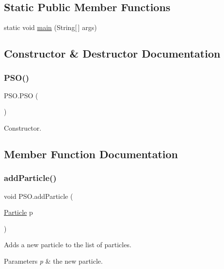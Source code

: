 \subsection*{Static Public Member Functions}
\begin{DoxyCompactItemize}
\item 
static void \hyperlink{class_p_s_o_a966198c3d9ecb21acf593a5e922ba843}{main} (String\mbox{[}$\,$\mbox{]} args)
\end{DoxyCompactItemize}


\subsection{Constructor \& Destructor Documentation}
\mbox{\label{class_p_s_o_a0aeec4970276a5e318b613e8a192064e}} 
\subsubsection{\texorpdfstring{P\+S\+O()}{PSO()}}
{\footnotesize\ttfamily P\+S\+O.\+P\+SO (\begin{DoxyParamCaption}{ }\end{DoxyParamCaption})}

Constructor. 

\subsection{Member Function Documentation}
\mbox{\label{class_p_s_o_ac3676d8b4b6eb1fcb0c05a14a20af85c}} 
\subsubsection{\texorpdfstring{add\+Particle()}{addParticle()}}
{\footnotesize\ttfamily void P\+S\+O.\+add\+Particle (\begin{DoxyParamCaption}\item[{\hyperlink{class_particle}{Particle}}]{p }\end{DoxyParamCaption})}

Adds a new particle to the list of particles. 
\begin{DoxyParams}{Parameters}
{\em p} & the new particle. \\
\hline
\end{DoxyParams}
\mbox{\label{class_p_s_o_a0d3cd48e829ba5ccb754e26f1890e51b}} 
